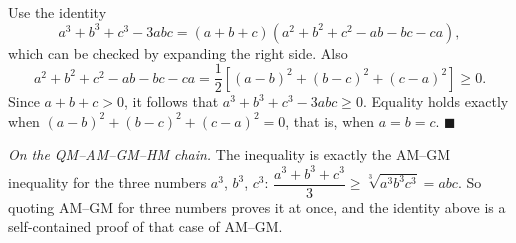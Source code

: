 Use the identity
\[a^3+b^3+c^3-3abc=(a+b+c)\left(a^2+b^2+c^2-ab-bc-ca\right),\]
which can be checked by expanding the right side. Also
\[a^2+b^2+c^2-ab-bc-ca=\dfrac{1}{2}\left[(a-b)^2+(b-c)^2+(c-a)^2\right]\ge0 .\]
Since $a+b+c>0$, it follows that $a^3+b^3+c^3-3abc\ge0$. Equality holds exactly when $(a-b)^2+(b-c)^2+(c-a)^2=0$, that is, when $a=b=c$. $\blacksquare$

\emph{On the QM--AM--GM--HM chain.} The inequality is exactly the AM--GM inequality for the three numbers $a^3$, $b^3$, $c^3$: $\dfrac{a^3+b^3+c^3}{3}\ge\sqrt[3]{a^3b^3c^3}=abc$. So quoting AM--GM for three numbers proves it at once, and the identity above is a self-contained proof of that case of AM--GM.

